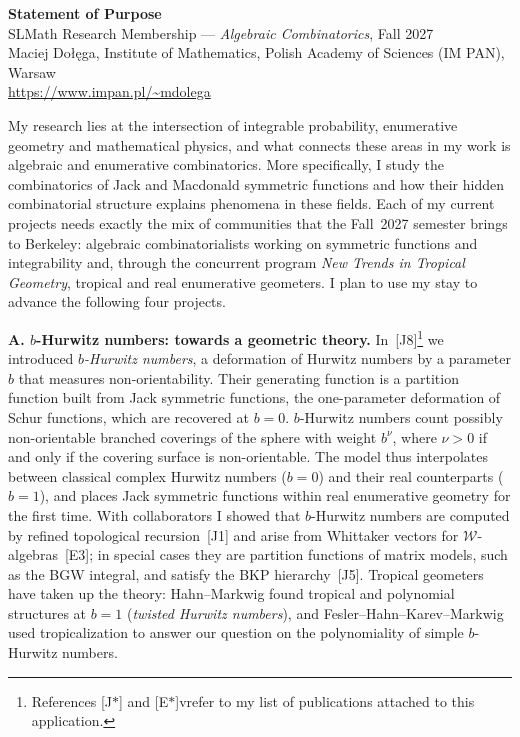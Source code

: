 \documentclass[11pt,a4paper]{amsart}
\newcommand{\proj}[1]{\par\smallskip\noindent\textbf{#1}\;}
\begin{document}
 
\begin{center}
{\large\bfseries Statement of Purpose}\\[2pt]
SLMath Research Membership --- \emph{Algebraic Combinatorics}, Fall 2027\\[2pt]
Maciej Dołęga, Institute of Mathematics, Polish Academy of Sciences (IM PAN), Warsaw\\[2pt]
\url{https://www.impan.pl/~mdolega}
\end{center}
 
\smallskip
 
My research lies at the intersection of integrable probability, enumerative geometry and mathematical physics, and what connects these areas in my work is algebraic and enumerative combinatorics. More specifically, I study the combinatorics of Jack and Macdonald symmetric functions and how their hidden combinatorial structure explains phenomena in these fields. Each of my current projects needs exactly the mix of communities that the Fall~2027 semester brings to Berkeley: algebraic combinatorialists working on symmetric functions and integrability and, through the concurrent program \emph{New Trends in Tropical Geometry}, tropical and real enumerative geometers. I plan to use my stay to advance the following four projects.
 
\proj{A. $b$-Hurwitz numbers: towards a geometric theory.}
In~[J8]\footnote{References [J$\ast$] and [E$\ast$]vrefer to my list of publications attached to this application.} we introduced \emph{$b$-Hurwitz numbers}, a deformation of Hurwitz numbers by a parameter $b$ that measures non-orientability. Their generating function is a partition function built from Jack symmetric functions, the one-parameter deformation of Schur functions, which are recovered at $b=0$. $b$-Hurwitz numbers count possibly non-orientable branched coverings of the sphere with weight $b^{\nu}$, where $\nu>0$ if and only if the covering surface is non-orientable. The model thus interpolates between classical complex Hurwitz numbers ($b=0$) and their real counterparts ($b=1$), and places Jack symmetric functions within real enumerative geometry for the first time. With collaborators I showed that $b$-Hurwitz numbers are computed by refined topological recursion~[J1] and arise from Whittaker vectors for $\mathcal{W}$-algebras~[E3]; in special cases they are partition functions of matrix models, such as the BGW integral, and satisfy the BKP hierarchy~[J5]. Tropical geometers have taken up the theory: Hahn--Markwig found tropical and polynomial structures at $b=1$ (\emph{twisted Hurwitz numbers}), and Fesler--Hahn--Karev--Markwig used tropicalization to answer our question on the polynomiality of simple $b$-Hurwitz numbers.
 
\end{document}
